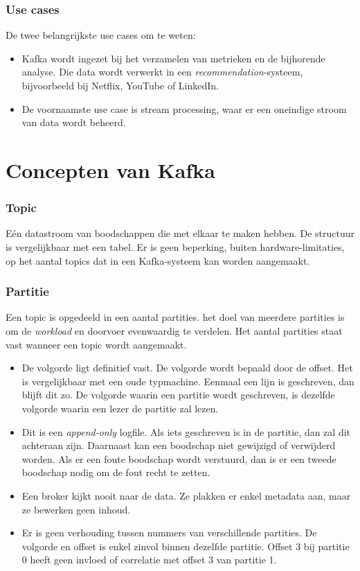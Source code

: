 \documentclass[a4paper,10pt,twoside]{report}
\begin{document}
\subsubsection{Use cases}

De twee belangrijkste use cases om te weten:

\begin{itemize}
	\item Kafka wordt ingezet bij het verzamelen van metrieken en de bijhorende analyse. Die data wordt verwerkt in een \textit{recommendation}-systeem, bijvoorbeeld bij Netflix, YouTube of LinkedIn.
	\item De voornaamste use case is stream processing, waar er een oneindige stroom van data wordt beheerd.
\end{itemize}


\section{Concepten van Kafka}

\subsubsection{Topic}

Eén datastroom van boodschappen die met elkaar te maken hebben. De structuur is vergelijkbaar met een tabel. Er is geen beperking, buiten hardware-limitaties, op het aantal topics dat in een Kafka-systeem kan worden aangemaakt.

\subsubsection{Partitie}

Een topic is opgedeeld in een aantal partities. het doel van meerdere partities is om de \textit{workload} en doorvoer evenwaardig te verdelen. Het aantal partities staat vast wanneer een topic wordt aangemaakt.

\begin{itemize}
	\item De volgorde ligt definitief vast. De volgorde wordt bepaald door de offset. Het is vergelijkbaar met een oude typmachine. Eenmaal een lijn is geschreven, dan blijft dit zo. De volgorde waarin een partitie wordt geschreven, is dezelfde volgorde waarin een lezer de partitie zal lezen.
	\item Dit is een \textit{append-only} logfile. Als iets geschreven is in de partitie, dan zal dit achteraan zijn. Daarnaast kan een boodschap niet gewijzigd of verwijderd worden. Als er een foute boodschap wordt verstuurd, dan is er een tweede boodschap nodig om de fout recht te zetten.
	\item Een broker kijkt nooit naar de data. Ze plakken er enkel metadata aan, maar ze bewerken geen inhoud.
	\item Er is geen verhouding tussen nummers van verschillende partities. De volgorde en offset is enkel zinvol binnen dezelfde partitie. Offset 3 bij partitie 0 heeft geen invloed of correlatie met offset 3 van partitie 1.
\end{itemize}
\end{document}
